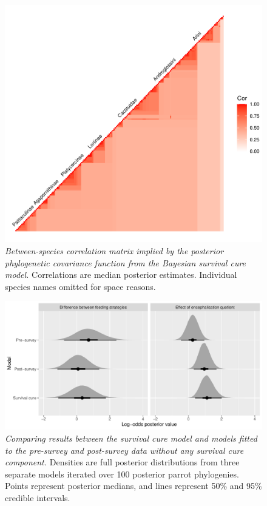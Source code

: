 \documentclass[
  man,floatsintext]{apa6}
\begin{document}
\newpage



\begin{figure}
\centering
\includegraphics{manuscript_files/figure-latex/plotSurvCure6-1.pdf}
\caption{\label{fig:plotSurvCure6}\emph{Between-species correlation matrix implied by the posterior phylogenetic covariance function from the Bayesian survival cure model.} Correlations are median posterior estimates. Individual species names omitted for space reasons.}
\end{figure}

\newpage



\begin{figure}
\centering
\includegraphics{manuscript_files/figure-latex/plotComparison-1.pdf}
\caption{\label{fig:plotComparison}\emph{Comparing results between the survival cure model and models fitted to the pre-survey and post-survey data without any survival cure component.} Densities are full posterior distributions from three separate models iterated over 100 posterior parrot phylogenies. Points represent posterior medians, and lines represent 50\% and 95\% credible intervals.}
\end{figure}
\end{document}
